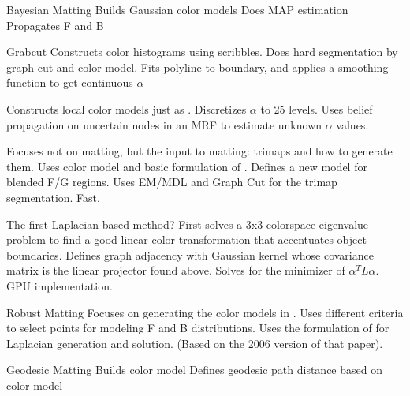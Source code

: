 \documentclass{beamer}
\begin{document}
\begin{frame}[allowframebreaks]{Bayesian Matting \cite{chuang2001bayesian}}
 Builds Gaussian color models
 Does MAP estimation
 Propagates F and B
\end{frame}

\begin{frame}[allowframebreaks]{Grabcut \cite{rother2004grabcut}}
 Constructs color histograms using scribbles.
 Does hard segmentation by graph cut and color model.
 Fits polyline to boundary, and applies a smoothing function to get continuous $\alpha$
\end{frame}

\begin{frame}[allowframebreaks]{\cite{wang2005iterative}}
 Constructs local color models just as \cite{chuang2001bayesian}.
 Discretizes $\alpha$ to 25 levels.
 Uses belief propagation on uncertain nodes in an MRF to estimate unknown $\alpha$ values.
\end{frame}

\begin{frame}[allowframebreaks]{\cite{juan2005trimap}}
 Focuses not on matting, but the input to matting: trimaps and how to generate them.
 Uses color model and basic formulation of \cite{rother2004grabcut}.
 Defines a new model for blended F/G regions.
 Uses EM/MDL and Graph Cut for the trimap segmentation.
 Fast.
\end{frame}

\begin{frame}[allowframebreaks]{\cite{grady2005random}}
 The first Laplacian-based method?
 First solves a 3x3 colorspace eigenvalue problem to find a good linear
 color transformation that accentuates object boundaries.
 Defines graph adjacency with Gaussian kernel whose covariance matrix is
 the linear projector found above.
 Solves for the minimizer of $\alpha^TL\alpha$.
 GPU implementation.
\end{frame}

\begin{frame}[allowframebreaks]{Robust Matting \cite{wang2007optimized}}
 Focuses on generating the color models in \cite{chuang2001bayesian}.
 Uses different criteria to select points for modeling F and B distributions.
 Uses the formulation of \cite{levin2008closed} for Laplacian generation and solution.
 (Based on the 2006 version of that paper).
\end{frame}

\begin{frame}[allowframebreaks]{Geodesic Matting\cite{bai2007geodesic}}
 Builds color model
 Defines geodesic path distance based on color model
\end{frame}
\end{document}
